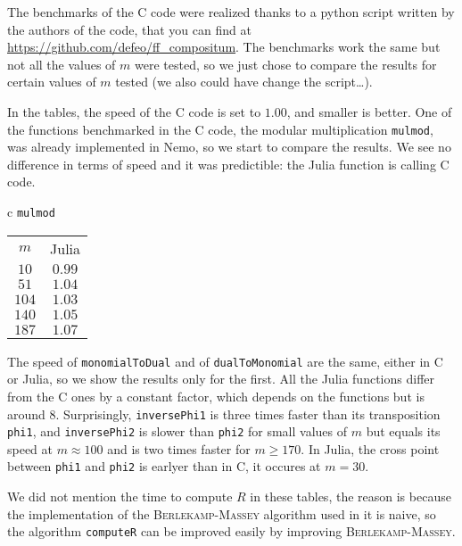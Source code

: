 \documentclass[a4paper,11pt]{article}
\theoremstyle{break}
\theoremstyle{definition}
\theoremstyle{remark}
\begin{document}
The benchmarks of the C code were realized thanks to a python 
script written by the authors of the code, that you can find at 
\url{https://github.com/defeo/ff\_compositum}. The benchmarks work the same but not 
all the values of $m$ were tested, so we just chose to compare the results for 
certain values of $m$ tested (we also could have change the script\dots).

In the tables, the speed of
the C code is set to $1.00$, and smaller is better. One of the functions 
benchmarked in the C code, the modular multiplication \texttt{mulmod}, was 
already implemented in Nemo, so we start to compare the results. We see no
difference in terms of speed and it was predictible: the Julia
function is calling C code.

\begin{center}
  \begin{tabular}[here]{c}
    \texttt{mulmod} \\
    \begin{tabular}[here]{cc}
   $m$ & Julia \\
   $10$ & $0.99$\\
   $51$ & $1.04$\\
   $104$ & $1.03$\\
   $140$ & $1.05$\\
   $187$ & $1.07$\\
    \end{tabular}
  \end{tabular}
\end{center}
The speed of \texttt{monomialToDual} and of \texttt{dualToMonomial} are the 
same, either in C or Julia, so we show the results only for the first.
All the Julia functions differ from the C ones by a
constant factor, which depends on the functions but is around $8$.
Surprisingly, \texttt{inversePhi1} is three times faster than its transposition
\texttt{phi1}, and \texttt{inversePhi2} is slower than \texttt{phi2} for small
values of $m$ but equals its speed at $m\approx 100$ and is two times faster for $m\geq170$.
In Julia, the cross point between \texttt{phi1} and \texttt{phi2} is earlyer than
in C, it occures at $m=30$.

We did not mention the time to compute $R$ in these tables, the reason 
is because the implementation of the \textsc{Berlekamp-Massey} algorithm used 
in it is naive, so the algorithm \texttt{computeR} can be improved easily by 
improving \textsc{Berlekamp-Massey}.
\end{document}
